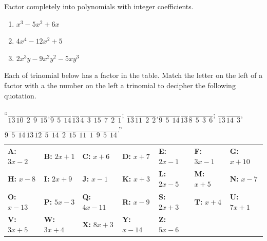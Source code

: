 \documentclass[
  en,11pt]{elegantbook}
\let\BeginKnitrBlock\begin \let\EndKnitrBlock\end
\begin{document}
\BeginKnitrBlock{exercise}
\protect\hypertarget{exr:unnamed-chunk-31}{}{\label{exr:unnamed-chunk-31} }
Factor completely into polynomials with integer coefficients.

\begin{enumerate}
\def\labelenumi{\arabic{enumi}.}

\item
  \(x^3-5x^2+6x\)
\item
  \(4x^4-12x^2+5\)
\item
  \(2x^3y-9x^2y^2-5xy^3\)
\end{enumerate}
\EndKnitrBlock{exercise}

\BeginKnitrBlock{exercise}
\protect\hypertarget{exr:unnamed-chunk-32}{}{\label{exr:unnamed-chunk-32} }
Each of trinomial below has a factor in the table. Match the letter on the left of a factor with a the number on the left a trinomial to decipher the following quotation.

``\(\dfrac{\phantom{A}}{13}\)\quad \(\dfrac{\phantom{A}}{10~~2~~9~~15}\),\quad \(\dfrac{\phantom{A}}{9~~5~~14}\)\quad \(\dfrac{\phantom{A}}{13}\)\quad \(\dfrac{\phantom{A}}{4~~3~~15~~7~~2~~1}\);
\phantom{"} \(\dfrac{\phantom{A}}{13}\)\quad \(\dfrac{\phantom{A}}{11~~2~~2}\),\quad \(\dfrac{\phantom{A}}{9~~5~~14}\)\quad \(\dfrac{\phantom{A}}{13}\)\quad \(\dfrac{\phantom{A}}{8~~5~~3~~6}\);
\phantom{"} \(\dfrac{\phantom{A}}{13}\)\quad \(\dfrac{\phantom{A}}{14~~3}\),\quad \(\dfrac{\phantom{A}}{9~~5~~14}\)\quad \(\dfrac{\phantom{A}}{13}\)\quad \(\dfrac{\phantom{A}}{12~~5~~14~~2~~15~~11~~1~~9~~5~~14}\).''

\begin{longtable}[]{@{}lllllll@{}}
\toprule
\endhead
\textbf{A:} \(3x-2\) & \textbf{B:} \(2x+1\) & \textbf{C:} \(x+6\) & \textbf{D:} \(x+7\) & \textbf{E:} \(2x-1\) & \textbf{F:} \(3x-1\) & \textbf{G:} \(x+10\)\tabularnewline
\textbf{H:} \(x-8\) & \textbf{I:} \(2x+9\) & \textbf{J:} \(x-1\) & \textbf{K:} \(x+3\) & \textbf{L:} \(2x-5\) & \textbf{M:} \(x+5\) & \textbf{N:} \(x-7\)\tabularnewline
\textbf{O:} \(x-13\) & \textbf{P:} \(5x-3\) & \textbf{Q:} \(4x-11\) & \textbf{R:} \(x-9\) & \textbf{S:} \(2x+3\) & \textbf{T:} \(x+4\) & \textbf{U:} \(7x+1\)\tabularnewline
\textbf{V:} \(3x+5\) & \textbf{W:} \(3x+4\) & \textbf{X:} \(8x+3\) & \textbf{Y:} \(x-14\) & \textbf{Z:} \(5x-6\) & &\tabularnewline
\bottomrule
\end{longtable}
\EndKnitrBlock{exercise}
\end{document}
